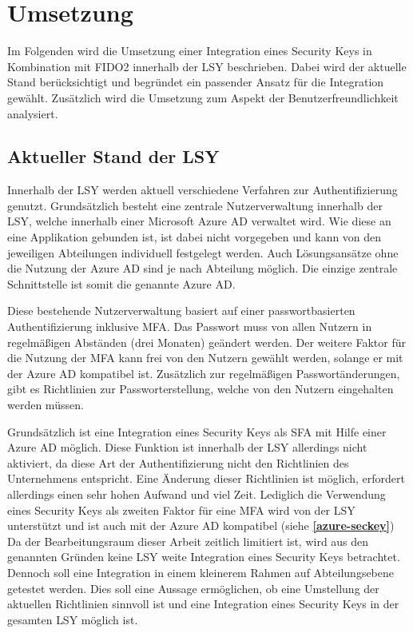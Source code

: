 
\chapter{Umsetzung}
Im Folgenden wird die Umsetzung einer Integration eines Security Keys in Kombination mit \ac{FIDO}2 innerhalb der \ac{LSY} beschrieben. Dabei wird der aktuelle Stand berücksichtigt und begründet ein passender Ansatz für die Integration gewählt. Zusätzlich wird die Umsetzung zum Aspekt der Benutzerfreundlichkeit analysiert.

\section{Aktueller Stand der LSY} \label{current}
Innerhalb der \ac{LSY} werden aktuell verschiedene Verfahren zur Authentifizierung genutzt. Grundsätzlich besteht eine zentrale Nutzerverwaltung innerhalb der \ac{LSY}, welche innerhalb einer Microsoft Azure \ac{AD} verwaltet wird. Wie diese an eine Applikation gebunden ist, ist dabei nicht vorgegeben und kann von den jeweiligen Abteilungen individuell festgelegt werden. Auch Lösungsansätze ohne die Nutzung der Azure \ac{AD} sind je nach Abteilung möglich. Die einzige zentrale Schnittstelle ist somit die genannte Azure \ac{AD}.

Diese bestehende Nutzerverwaltung basiert auf einer passwortbasierten Authentifizierung inklusive \ac{MFA}. Das Passwort muss von allen Nutzern in regelmäßigen Abständen (drei Monaten) geändert werden. Der weitere Faktor für die Nutzung der \ac{MFA} kann frei von den Nutzern gewählt werden, solange er mit der Azure \ac{AD} kompatibel ist. Zusätzlich zur regelmäßigen Passwortänderungen, gibt es Richtlinien zur Passworterstellung, welche von den Nutzern eingehalten werden müssen. 

Grundsätzlich ist eine Integration eines Security Keys als \ac{SFA} mit Hilfe einer Azure \ac{AD} möglich. Diese Funktion ist innerhalb der \ac{LSY} allerdings nicht aktiviert, da diese Art der Authentifizierung nicht den Richtlinien des Unternehmens entspricht. Eine Änderung dieser Richtlinien ist möglich, erfordert allerdings einen sehr hohen Aufwand und viel Zeit. Lediglich die Verwendung eines Security Keys als zweiten Faktor für eine \ac{MFA} wird von der \ac{LSY} unterstützt und ist auch mit der Azure \ac{AD} kompatibel (siehe \textbf{\ref{azure-seckey}}) Da der Bearbeitungsraum dieser Arbeit zeitlich limitiert ist, wird aus den genannten Gründen keine \ac{LSY} weite Integration eines Security Keys betrachtet. Dennoch soll eine Integration in einem kleinerem Rahmen auf Abteilungsebene getestet werden. Dies soll eine Aussage ermöglichen, ob eine Umstellung der aktuellen Richtlinien sinnvoll ist und eine Integration eines Security Keys in der gesamten \ac{LSY} möglich ist.

